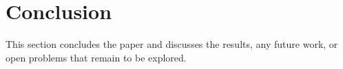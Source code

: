 

\section{Conclusion}
This section concludes the paper and discusses the results, any future work, or open problems that remain to be explored.